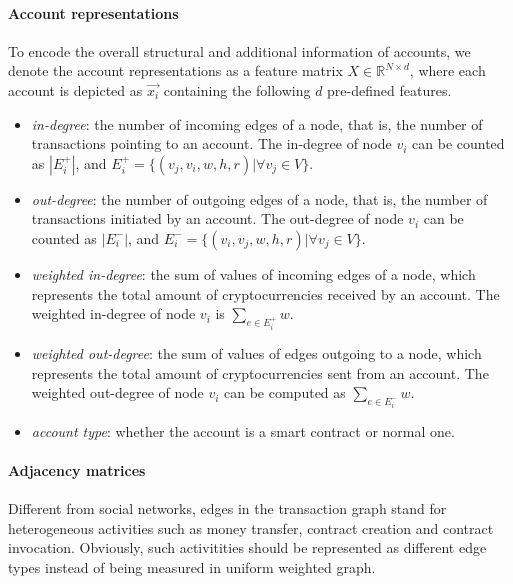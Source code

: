 

\paragraph{Account representations} To encode the overall structural and additional information of accounts, we denote the account representations as a feature matrix $X \in \mathbb{R}^{N \times d}$, where each account is depicted as $\vec{x_i}$ containing the following $d$ pre-defined features.

\begin{itemize}
	\item \emph{in-degree}: the number of incoming edges of a node, that is, the number of transactions pointing to an account. The in-degree of node $v_i$ can be counted as $|E_{i}^{+}|$, and $E_{i}^{+}=\{(v_j,v_i,w,h,r)| \forall v_j \in V\}$.
	\item \emph{out-degree}: the number of outgoing edges of a node, that is, the number of transactions initiated by an account. The out-degree of node $v_i$ can be counted as $|E_{i}^{-}|$, and $E_{i}^{-}=\{(v_i,v_j,w,h,r)| \forall v_j \in V\}$.
	\item \emph{weighted in-degree}: the sum of values of incoming edges of a node, which represents the total amount of cryptocurrencies received by an account. The weighted in-degree of node $v_i$ is $\sum_{e\in E_{i}^{+}}w$.
	\item \emph{weighted out-degree}: the sum of values of edges outgoing to a node, which represents the total amount of cryptocurrencies sent from an account. The weighted out-degree of node $v_i$ can be computed as $\sum_{e\in E_{i}^{-}}w$.
	\item \emph{account type}: whether the account is a smart contract or normal one.
\end{itemize}

\paragraph{Adjacency matrices} Different from social networks, edges in the transaction graph stand for heterogeneous activities such as money transfer, contract creation and contract invocation. Obviously, such %
activitities should be represented as different edge types instead of being measured in uniform weighted graph.

